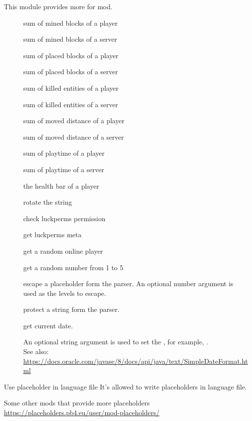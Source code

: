 This module provides more  for  mod.

\begin{description}
    \item [] sum of mined blocks of a player
    \item[] sum of mined blocks of a server
    \item[] sum of placed blocks of a player
    \item[] sum of placed blocks of a server
    \item[] sum of killed entities of a player
    \item[] sum of killed entities of a server
    \item[] sum of moved distance of a player
    \item[] sum of moved distance of a server
    \item[] sum of playtime of a player
    \item[] sum of playtime of a server
    \item[] the health bar of a player
    \item[] rotate the string 
    \item[] check luckperms permission
    \item[] get luckperms meta
    \item[] get a random online player
    \item[] get a random number from 1 to 5
    \item[] {escape a placeholder form the parser.
    An optional number argument is used as the levels to escape.}
    \item[] {protect a string form the parser.}
    \item[] {get current date.

    An optional string argument is used to set the , for example, .\\
    See also: \url{https://docs.oracle.com/javase/8/docs/api/java/text/SimpleDateFormat.html}}
\end{description}

\begin{tips}{Use placeholder in language file}
    It's allowed to write placeholders in language file.
\end{tips}

\begin{note}{Some other mods that provide more placeholders}
    \url{https://placeholders.pb4.eu/user/mod-placeholders/}
\end{note}



